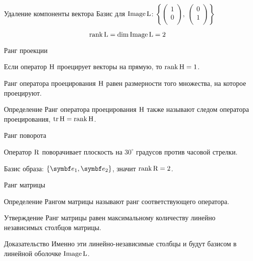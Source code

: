 \begin{frame}{Удаление компоненты вектора}
\pause 
Базис для $\operatorname{Image} \operatorname{L}$: $\left\{\begin{pmatrix}
1 \\
0 \\
\end{pmatrix}, \;
\begin{pmatrix}
0 \\
1 \\
\end{pmatrix} \right\}$

\[
\rank \operatorname{L} = \dim \operatorname{Image} \operatorname{L} = 2    
\]

\end{frame}

\begin{frame}{Ранг проекции}

Если оператор $\mathrm{H}$ проецирует векторы на прямую, то $\rank \mathrm{H} = 1$.

\pause

Ранг оператора проецирования $\mathrm{H}$ равен размерности того множества, на которое проецируют.

\pause

\begin{block}{Определение}
Ранг оператора проецирования $\mathrm{H}$ также называют \alert{следом оператора проецирования},
$\trace \HH = \rank \HH$.
\end{block}


\end{frame}


\begin{frame}{Ранг поворота}

Оператор $\mathrm{R}$ поворачивает плоскость на $30^{\circ}$ градусов против часовой стрелки.

\pause

Базис образа: $\{ \be_1, \be_2 \}$, значит $\rank \mathrm{R}  = 2$.



\end{frame}
    





\begin{frame}{Ранг матрицы}

\begin{block}{Определение}
\alert{Рангом матрицы} называют ранг соответствующего оператора.
\end{block}

\pause

\begin{block}{Утверждение}
Ранг матрицы равен максимальному количеству линейно независимых столбцов матрицы. 
\end{block}

\pause
\begin{block}{Доказательство}
Именно эти линейно-независимые столбцы и будут базисом в линейной оболочке $\operatorname{Image} \operatorname{L}$. 
\end{block}


\end{frame}




